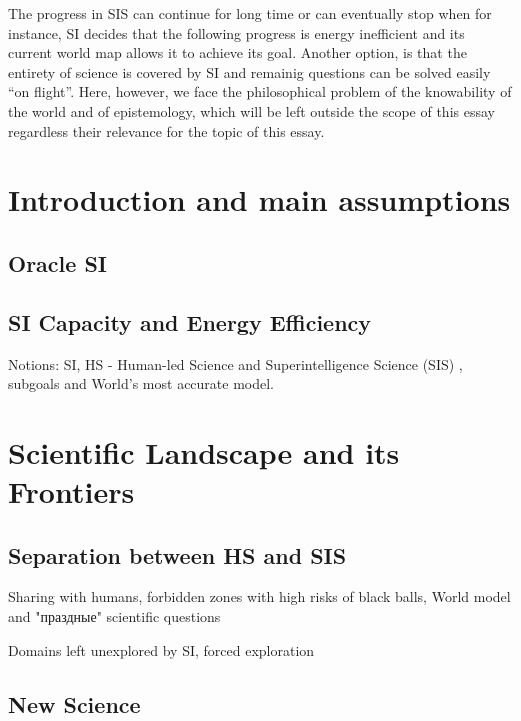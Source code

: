 \documentclass[a4paper,11pt]{article}
\begin{document}
The progress in SIS can continue for long time or can eventually stop when for instance, SI decides that the following progress is energy inefficient and its current world map allows it to achieve its goal. Another option, is that the entirety of science is covered by SI and remainig questions can be solved easily ``on flight''. Here, however, we face the philosophical problem of the knowability of the world and of epistemology, which will be left outside the scope of this essay regardless their relevance for the topic of this essay.


\newpage

	\section{Introduction and main assumptions}

        \subsection{Oracle SI}

        \subsection{SI Capacity and Energy Efficiency}

        Notions: SI, HS - Human-led Science  and Superintelligence Science (SIS) , subgoals and World's most accurate model.

    \section{Scientific Landscape and its Frontiers}

        \subsection{Separation between HS and SIS}

        Sharing with humans, forbidden zones with high risks of black balls, World model and "праздные" scientific questions

        Domains left unexplored by SI, forced exploration

        \subsection{New Science}
\end{document}
